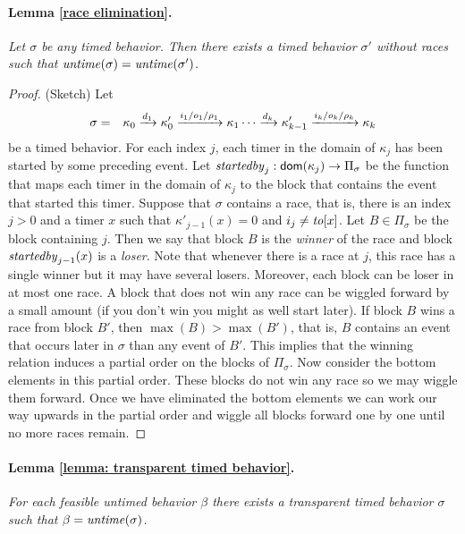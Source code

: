 \paragraph{Lemma \ref{race elimination}.}
\emph{Let $\sigma$ be any timed behavior.
Then there exists a timed behavior $\sigma'$ without races such that $\mathit{untime}(\sigma)=\mathit{untime}(\sigma')$.}

\begin{proof}
(Sketch) Let
\begin{eqnarray*}
\sigma & = & \kappa_0 \xrightarrow{d_1} \kappa'_0 \xrightarrow{i_1/o_1/\rho_1} \kappa_1 \cdots
\xrightarrow{d_k} \kappa'_{k-1} \xrightarrow{i_k/o_k/\rho_k} \kappa_{k}
\end{eqnarray*}
be a timed behavior.
%
For each index $j$, each timer in the domain of $\kappa_j$ has been started by some preceding event.
Let $\mathit{startedby}_j : {\textsf{dom}}(\kappa_j) \rightarrow \Pi_\sigma$ be the function that maps each timer in
the domain of $\kappa_j$ to the block that contains the event that started this timer.
Suppose that $\sigma$ contains a race, that is, there is an index $j>0$ and a timer $x$  
such that $\kappa'_{j-1}(x) = 0$ and $i_j \neq \mathit{to}[x]$.
Let $B \in \Pi_\sigma$ be the block containing $j$. Then we say that block $B$ is the \emph{winner} of the race and block
$\mathit{startedby}_{j-1}(x)$ is a \emph{loser}.
Note that whenever there is a race at $j$, this race has a single winner but it may have several losers.
Moreover, each block can be loser in at most one race.
A block that does not win any race can be wiggled forward by a small amount (if you don't win you might as well start later).
If block $B$ wins a race from block $B'$, then $\max(B)>\max(B')$, that is, $B$ contains an event that occurs later
in $\sigma$ than any event of $B'$.
This implies that the winning relation induces a partial order on the blocks of $\Pi_\sigma$.
Now consider the bottom elements in this partial order. These blocks do not win any race so we may wiggle them forward.
Once we have eliminated the bottom elements we can work our way upwards in the partial order and wiggle all blocks
forward one by one until no more races remain.
\end{proof}

\paragraph{Lemma \ref{lemma: transparent timed behavior}.}
\emph{For each feasible untimed behavior $\beta$ there exists
a transparent timed behavior $\sigma$ such that $\beta = \mathit{untime}(\sigma)$.}

